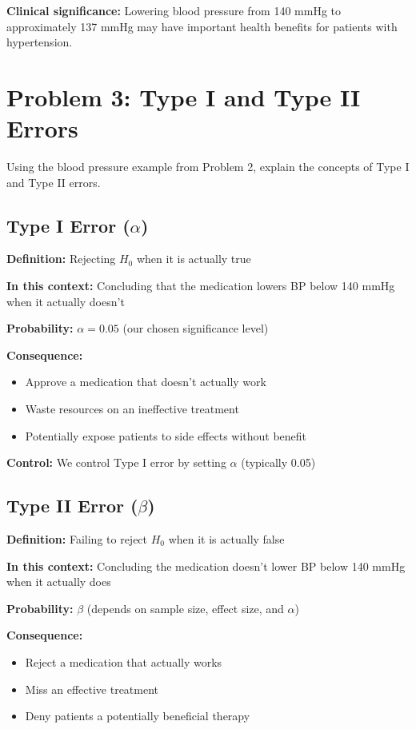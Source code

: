 \documentclass[11pt]{article}
\begin{document}
\textbf{Clinical significance:} Lowering blood pressure from 140 mmHg to approximately 137 mmHg may have important health benefits for patients with hypertension.

\vspace{12pt}

\section*{Problem 3: Type I and Type II Errors}

Using the blood pressure example from Problem 2, explain the concepts of Type I and Type II errors.

\subsection*{Type I Error ($\alpha$)}

\textbf{Definition:} Rejecting $H_0$ when it is actually true

\textbf{In this context:} Concluding that the medication lowers BP below 140 mmHg when it actually doesn't

\textbf{Probability:} $\alpha = 0.05$ (our chosen significance level)

\textbf{Consequence:}
\begin{itemize}
\item Approve a medication that doesn't actually work
\item Waste resources on an ineffective treatment
\item Potentially expose patients to side effects without benefit
\end{itemize}

\textbf{Control:} We control Type I error by setting $\alpha$ (typically 0.05)

\subsection*{Type II Error ($\beta$)}

\textbf{Definition:} Failing to reject $H_0$ when it is actually false

\textbf{In this context:} Concluding the medication doesn't lower BP below 140 mmHg when it actually does

\textbf{Probability:} $\beta$ (depends on sample size, effect size, and $\alpha$)

\textbf{Consequence:}
\begin{itemize}
\item Reject a medication that actually works
\item Miss an effective treatment
\item Deny patients a potentially beneficial therapy
\end{itemize}
\end{document}
